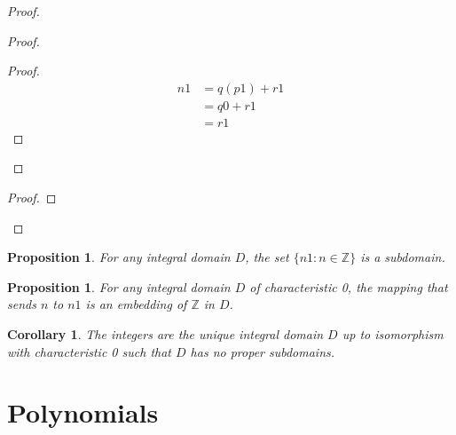 \documentclass{article}
\let\qed\relax
\newtheorem{proposition}[axiom]{Proposition}
\newtheorem{corollary}{Corollary}[axiom]
\theoremstyle{definition}
\begin{document}
    \begin{proof}
        \pf
        \begin{proof}
            \begin{proof}
                \pf
                \begin{align*}
                    n1 & = q(p1) + r1 \\
                    & = q0 + r1 \\
                    & = r1
                \end{align*}
            \end{proof}
        \end{proof}
        \begin{proof}
        \end{proof}
        \qed
    \end{proof}

    \begin{proposition}
        For any integral domain $D$, the set $\{ n1 : n \in \mathbb{Z} \}$ is a subdomain.
    \end{proposition}

    \begin{proposition}
        For any integral domain $D$ of characteristic 0, the mapping that sends $n$ to $n1$ is an
        embedding of $\mathbb{Z}$ in $D$.
    \end{proposition}

    \begin{corollary}
        The integers are the unique integral domain $D$ up to isomorphism with characteristic 0 such that
        $D$ has no proper subdomains.
    \end{corollary}

    \section{Polynomials}
\end{document}
